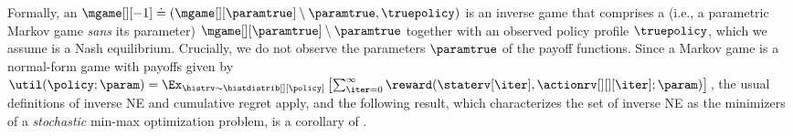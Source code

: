

Formally, an  $\mgame[][-1] \doteq
(\mgame[][\paramtrue] \setminus \paramtrue, \truepolicy)$ is an inverse game that comprises a  (i.e., a parametric Markov game \emph{sans\/} its parameter) $\mgame[][\paramtrue] \setminus \paramtrue$ together with an observed policy profile $\truepolicy$, which we assume is a Nash equilibrium.
Crucially, we do not observe the parameters $\paramtrue$ of the payoff functions.
Since a Markov game is a normal-form game with payoffs given by $\util(\policy; \param) = \Ex_{\histrv \sim \histdistrib[][\policy]} \left[\sum_{\iter = 0}^\infty \reward(\staterv[\iter], \actionrv[][][\iter]; \param) \right]$, the usual definitions of inverse NE and cumulative regret apply, and the following result, which characterizes the set of inverse NE as the minimizers of a \emph{stochastic\/} min-max optimization problem, is a corollary of .

